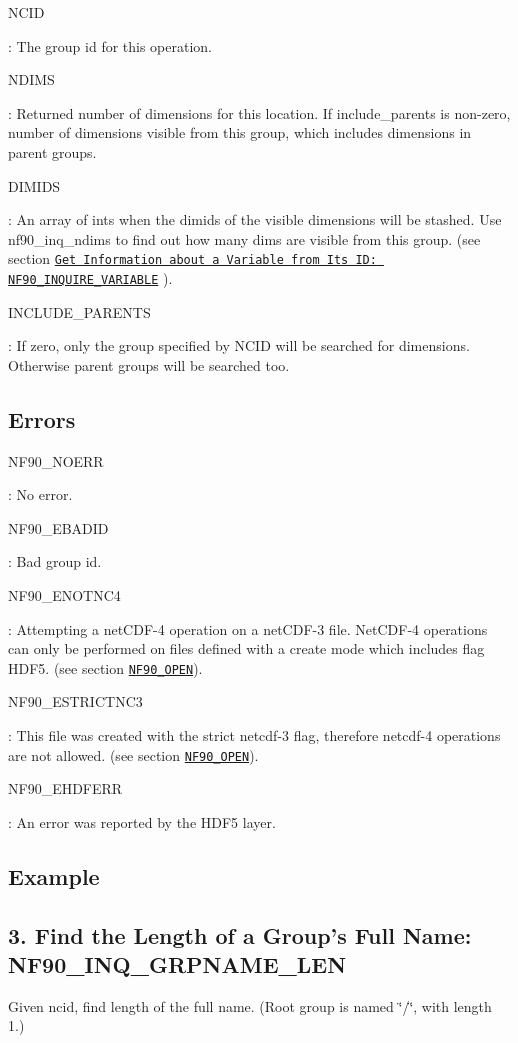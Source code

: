 {\ttfamily N\+C\+ID}

\+: The group id for this operation.

{\ttfamily N\+D\+I\+MS}

\+: Returned number of dimensions for this location. If include\+\_\+parents is non-\/zero, number of dimensions visible from this group, which includes dimensions in parent groups.

{\ttfamily D\+I\+M\+I\+DS}

\+: An array of ints when the dimids of the visible dimensions will be stashed. Use nf90\+\_\+inq\+\_\+ndims to find out how many dims are visible from this group. (see section \href{#f90-get-information-about-a-variable-from-its-id-nf90_inquire_variable}{\tt Get Information about a Variable from Its I\+D\+: N\+F90\+\_\+\+I\+N\+Q\+U\+I\+R\+E\+\_\+\+V\+A\+R\+I\+A\+B\+LE} ).

{\ttfamily I\+N\+C\+L\+U\+D\+E\+\_\+\+P\+A\+R\+E\+N\+TS}

\+: If zero, only the group specified by N\+C\+ID will be searched for dimensions. Otherwise parent groups will be searched too.

\subsection*{Errors}

{\ttfamily N\+F90\+\_\+\+N\+O\+E\+RR}

\+: No error.

{\ttfamily N\+F90\+\_\+\+E\+B\+A\+D\+ID}

\+: Bad group id.

{\ttfamily N\+F90\+\_\+\+E\+N\+O\+T\+N\+C4}

\+: Attempting a net\+C\+D\+F-\/4 operation on a net\+C\+D\+F-\/3 file. Net\+C\+D\+F-\/4 operations can only be performed on files defined with a create mode which includes flag H\+D\+F5. (see section \href{#NF90_005fOPEN}{\tt N\+F90\+\_\+\+O\+P\+EN}).

{\ttfamily N\+F90\+\_\+\+E\+S\+T\+R\+I\+C\+T\+N\+C3}

\+: This file was created with the strict netcdf-\/3 flag, therefore netcdf-\/4 operations are not allowed. (see section \href{#NF90_005fOPEN}{\tt N\+F90\+\_\+\+O\+P\+EN}).

{\ttfamily N\+F90\+\_\+\+E\+H\+D\+F\+E\+RR}

\+: An error was reported by the H\+D\+F5 layer.

\subsection*{Example}\hypertarget{f90_groups_f90-find-the-length-of-a-groups-full-name-nf90_inq_grpname_len}{}\subsection{3. Find the Length of a Group’s Full Name\+: N\+F90\+\_\+\+I\+N\+Q\+\_\+\+G\+R\+P\+N\+A\+M\+E\+\_\+\+L\+E\+N }\label{f90_groups_f90-find-the-length-of-a-groups-full-name-nf90_inq_grpname_len}
Given ncid, find length of the full name. (Root group is named \char`\"{}/\char`\"{}, with length 1.)

